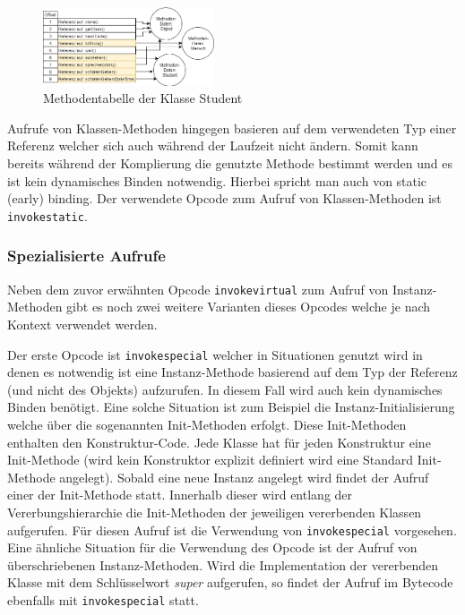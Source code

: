 \documentclass[conference]{IEEEtran}
\begin{document}
\begin{figure}[htbp] 
  \centering
     \includegraphics[width=0.45\textwidth]{Grafiken/MethodenTabelleAusHierarchie.png}
  \caption{Methodentabelle der Klasse Student}
  \label{fig:methodenTabelleUmlHierachie}
\end{figure}

Aufrufe von Klassen-Methoden hingegen basieren auf dem verwendeten Typ einer Referenz welcher sich auch während der Laufzeit nicht ändern. Somit kann bereits während der Komplierung die genutzte Methode bestimmt werden und es ist kein dynamisches Binden notwendig. Hierbei spricht man auch von static (early) binding. Der verwendete Opcode zum Aufruf von Klassen-Methoden ist \verb|invokestatic|. \cite{Venners.1997}

\subsubsection{Spezialisierte Aufrufe}
Neben dem zuvor erwähnten Opcode \verb|invokevirtual| zum Aufruf von Instanz-Methoden gibt es noch zwei weitere Varianten dieses Opcodes welche je nach Kontext verwendet werden. 

Der erste Opcode ist \verb|invokespecial| welcher in Situationen genutzt wird in denen es notwendig ist eine Instanz-Methode basierend auf dem Typ der Referenz (und nicht des Objekts) aufzurufen. In diesem Fall wird auch kein dynamisches Binden benötigt. Eine solche Situation ist zum Beispiel die Instanz-Initialisierung welche über die sogenannten Init-Methoden erfolgt. Diese Init-Methoden enthalten den Konstruktur-Code. Jede Klasse hat für jeden Konstruktur eine Init-Methode (wird kein Konstruktor explizit definiert wird eine Standard Init-Methode angelegt). Sobald eine neue Instanz angelegt wird findet der Aufruf einer der Init-Methode statt. Innerhalb dieser wird entlang der Vererbungshierarchie die Init-Methoden der jeweiligen vererbenden Klassen aufgerufen. Für diesen Aufruf ist die Verwendung von \verb|invokespecial| vorgesehen. Eine ähnliche Situation für die Verwendung des Opcode ist der Aufruf von überschriebenen Instanz-Methoden. Wird die Implementation der vererbenden Klasse mit dem Schlüsselwort \textit{super} aufgerufen, so findet der Aufruf im Bytecode ebenfalls mit \verb|invokespecial| statt.
\end{document}
